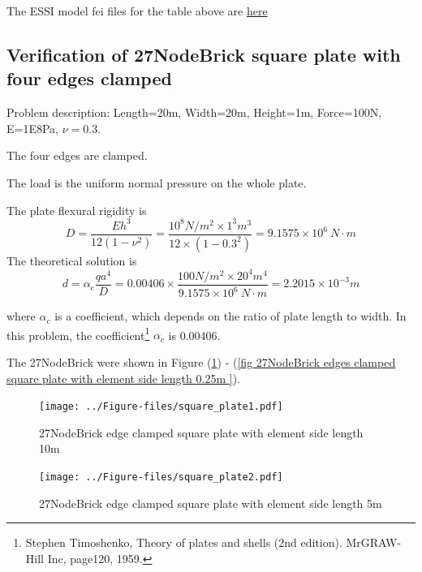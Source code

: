\documentclass[fleqn,11pt]{article}
\begin{document}
The ESSI model fei files for the table above are \href{https://github.com/yuan-energy/ESSI_Verification/blob/master/27NodeBrick/cantilever_stress/cantilever_stress.tar.gz?raw=true}{here}




\newpage
\subsection{Verification of 27NodeBrick square plate with four edges clamped}

Problem description: Length=20m, Width=20m, Height=1m, Force=100N, E=1E8Pa, $\nu=0.3$. 

The four edges are clamped. 

The load is the uniform normal pressure on the whole plate. 


The plate flexural rigidity is 
\begin{equation}
  D=\frac{Eh^3}{12(1-\nu^2)}=\frac{10^8 N/m^2 \times 1^3 m^3 }{12 \times (1-0.3^2) }= 9.1575 \times 10^6 \ N\cdot m
\end{equation}
The theoretical solution is 
\begin{equation}
  d=\alpha_c \frac{q a^4}{D}=0.00406\times \frac{100 N/m^2 \times 20^4 m^4}{9.1575 \times 10^6 \ N\cdot m}=2.2015\times 10^{-3} m
\end{equation}

where $\alpha_c$ is a coefficient, which depends on the ratio of plate length to width. In this problem, the coefficient\footnote{Stephen Timoshenko, Theory of plates and shells (2nd edition). MrGRAW-Hill Inc, page120, 1959.} $\alpha_c$ is 0.00406.

The 27NodeBrick were shown in Figure (\ref{fig 27NodeBrick edges clamped square plate with element side length 10m }) - (\ref{fig 27NodeBrick edges clamped square plate with element side length 0.25m }). 


\begin{figure}[H]
  \centering
  \texttt{[image: ../Figure-files/square\_plate1.pdf]}
  \caption{27NodeBrick edge clamped square plate with element side length 10m }
  \label{fig 27NodeBrick edges clamped square plate with element side length 10m }
\end{figure}

\newpage

\begin{figure}[H]
  \centering
  \texttt{[image: ../Figure-files/square\_plate2.pdf]}
  \caption{27NodeBrick edge clamped square plate with element side length 5m }
  \label{fig 27NodeBrick edges clamped square plate with element side length 5m }
\end{figure}
\end{document}
